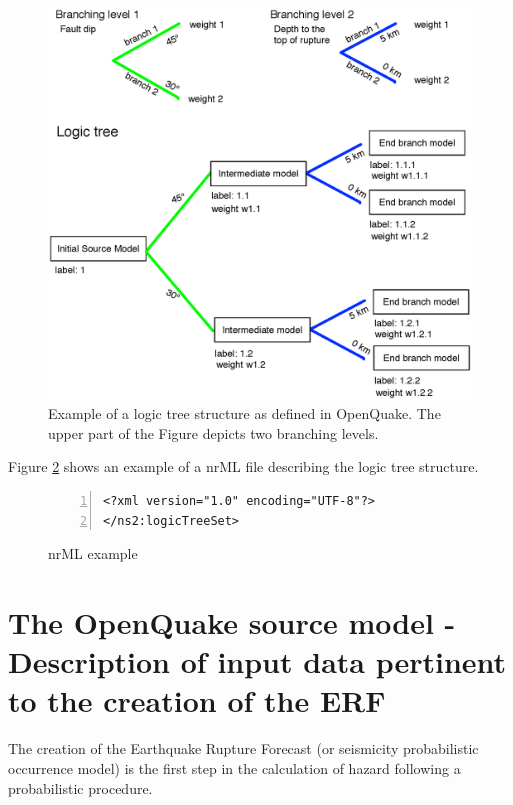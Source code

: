%
\begin{figure}
\includegraphics[width=15cm]{./Figures/Part_Hazard/logic_tree_schema.eps}
\caption{Example of a logic tree structure as defined in OpenQuake. The upper
part of the Figure depicts two branching levels.}
\label{fig:logic_tree_schema}
\end{figure}
%

Figure \ref{fig:nrMl_logic_tree_example} shows an example of a nrML file 
describing the logic tree structure.
%
\begin{figure}[!ht]
\small
\begin{Verbatim}[numbers=left,frame=single,fontsize=\small]
<?xml version="1.0" encoding="UTF-8"?>
</ns2:logicTreeSet>
\end{Verbatim}
\normalsize
\caption{nrML example}
\label{fig:nrMl_logic_tree_example}
\vspace*{1em}
\end{figure}
%
\section[The OpenQuake source model]{The OpenQuake source model - Description 
of input data pertinent to the creation of the ERF}
%
The creation of the Earthquake Rupture Forecast (or seismicity probabilistic 
occurrence model) is the first step in the calculation of hazard following a 
probabilistic procedure. 

